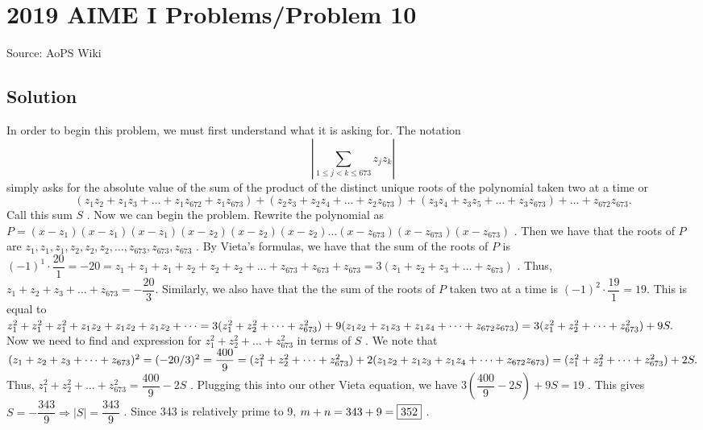 \documentclass[12pt]{article}
\begin{document}
\section*{{2019 AIME I Problems/Problem 10}}
Source: AoPS Wiki

\subsection*{Solution}
In order to begin this problem, we must first understand what it is asking for. The notation \[\left| \sum_{1 \le j <k \le 673} z_jz_k \right|\] simply asks for the absolute value of the sum of the product of the distinct unique roots of the polynomial taken two at a time or \[(z_1z_2+z_1z_3+ \dots + z_1z_{672}+z_1z_{673})+(z_2z_3+z_2z_4+ \dots +z_2z_{673}) + (z_3z_4+z_3z_5+ \dots +z_3z_{673}) + \dots +z_{672}z_{673}.\] Call this sum $S$ . Now we can begin the problem. Rewrite the polynomial as $P=(x-z_1)(x-z_1)(x-z_1)(x-z_2)(x-z_2)(x-z_2) \dots (x-z_{673})(x-z_{673})(x-z_{673})$ . Then we have that the roots of $P$ are $z_1,z_1,z_1,z_2,z_2,z_2, \dots , z_{673},z_{673},z_{673}$ . By Vieta's formulas, we have that the sum of the roots of $P$ is $(-1)^1 \cdot \dfrac{20}{1}=-20=z_1+z_1+z_1+z_2+z_2+z_2+ \dots + z_{673}+z_{673}+z_{673}=3(z_1+z_2+z_3+ \dots +z_{673})$ . Thus, $z_1+z_2+z_3+ \dots +z_{673}=- \dfrac{20}{3}.$ Similarly, we also have that the the sum of the roots of $P$ taken two at a time is $(-1)^2 \cdot \dfrac{19}{1} = 19.$ This is equal to $z_1^2+z_1^2+z_1^2+z_1z_2+z_1z_2+z_1z_2+ \dots = \\ 3(z_1^2+z_2^2+ \dots + z_{673}^2) + 9(z_1z_2+z_1z_3+z_1z_4+ \dots + z_{672}z_{673}) = 3(z_1^2+z_2^2+ \dots + z_{673}^2) + 9S.$ Now we need to find and expression for $z_1^2+z_2^2+ \dots + z_{673}^2$ in terms of $S$ . We note that $(z_1+z_2+z_3+ \dots +z_{673})^2= (-20/3)^2=\dfrac{400}{9} \\ =(z_1^2+z_2^2+ \dots + z_{673}^2)+2(z_1z_2+z_1z_3+z_1z_4+ \dots + z_{672}z_{673})=(z_1^2+z_2^2+ \dots + z_{673}^2)+2S.$ Thus, $z_1^2+z_2^2+ \dots + z_{673}^2= \dfrac{400}{9} -2S$ . Plugging this into our other Vieta equation, we have $3 \left( \dfrac{400}{9} -2S \right) +9S = 19$ . This gives $S = - \dfrac{343}{9} \Rightarrow \left| S \right| = \dfrac{343}{9}$ . Since 343 is relatively prime to 9, $m+n = 343+9 = \fbox{352}$ .
\end{document}
